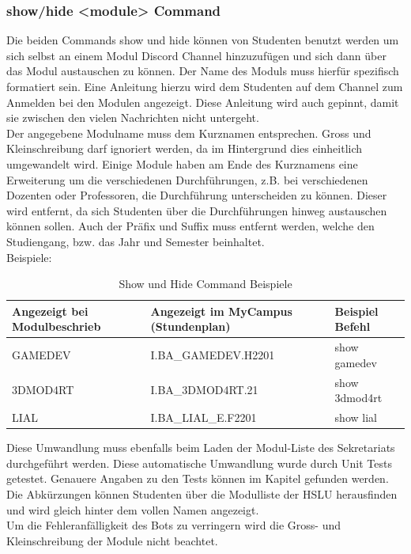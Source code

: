 \documentclass[a4paper, table]{article}
\begin{document}
\newpage
\subsubsection{show/hide <module> Command}

Die beiden Commands show und hide können von Studenten benutzt werden um sich selbst an einem Modul Discord Channel hinzuzufügen und sich dann über das Modul austauschen zu können.
Der Name des Moduls muss hierfür spezifisch formatiert sein.
Eine Anleitung hierzu wird dem Studenten auf dem Channel zum Anmelden bei den Modulen angezeigt.
Diese Anleitung wird auch gepinnt, damit sie zwischen den vielen Nachrichten nicht untergeht.\\
Der angegebene Modulname muss dem Kurznamen entsprechen.
Gross und Kleinschreibung darf ignoriert werden, da im Hintergrund dies einheitlich umgewandelt wird.
Einige Module haben am Ende des Kurznamens eine Erweiterung um die verschiedenen Durchführungen, \gls{z.B.} bei verschiedenen Dozenten oder Professoren, die Durchführung unterscheiden zu können.
Dieser wird entfernt, da sich Studenten über die Durchführungen hinweg austauschen können sollen.
Auch der Präfix und Suffix muss entfernt werden, welche den Studiengang, \gls{bzw.} das Jahr und Semester beinhaltet.\\
Beispiele:

\begin{table}[h]
    \centering
    \begin{tabular}{|l|l|l|}
        \hline
        \rowcolor[gray]{.9} Angezeigt bei Modulbeschrieb & Angezeigt im MyCampus (Stundenplan) & Beispiel Befehl \\
        \hline
        GAMEDEV & I.BA\_GAMEDEV.H2201 & show gamedev \\
        \hline
        3DMOD4RT & I.BA\_3DMOD4RT.21 & show 3dmod4rt \\
        \hline
        LIAL & I.BA\_LIAL\_E.F2201 & show lial \\
        \hline
    \end{tabular}
    \caption{Show und Hide Command Beispiele}
    \label{tab: Show und Hide Command Beispiele}
\end{table}

Diese Umwandlung muss ebenfalls beim Laden der Modul-Liste des Sekretariats durchgeführt werden.
Diese automatische Umwandlung wurde durch Unit Tests getestet.
Genauere Angaben zu den Tests können im Kapitel  gefunden werden.
Die Abkürzungen können Studenten über die Modulliste der HSLU herausfinden und wird gleich hinter dem vollen Namen angezeigt.\autocite{noauthor_bachelor_nodate} \\
Um die Fehleranfälligkeit des Bots zu verringern wird die Gross- und Kleinschreibung der Module nicht beachtet.
\end{document}
